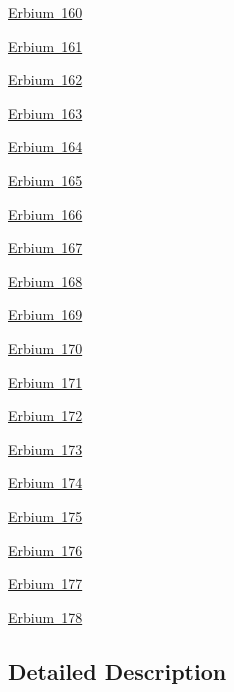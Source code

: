 \begin{DoxyCompactItemize}
\item 
\mbox{\hyperlink{group___isotope_const-_erbium-_er160}{Erbium 160}}
\item 
\mbox{\hyperlink{group___isotope_const-_erbium-_er161}{Erbium 161}}
\item 
\mbox{\hyperlink{group___isotope_const-_erbium-_er162}{Erbium 162}}
\item 
\mbox{\hyperlink{group___isotope_const-_erbium-_er163}{Erbium 163}}
\item 
\mbox{\hyperlink{group___isotope_const-_erbium-_er164}{Erbium 164}}
\item 
\mbox{\hyperlink{group___isotope_const-_erbium-_er165}{Erbium 165}}
\item 
\mbox{\hyperlink{group___isotope_const-_erbium-_er166}{Erbium 166}}
\item 
\mbox{\hyperlink{group___isotope_const-_erbium-_er167}{Erbium 167}}
\item 
\mbox{\hyperlink{group___isotope_const-_erbium-_er168}{Erbium 168}}
\item 
\mbox{\hyperlink{group___isotope_const-_erbium-_er169}{Erbium 169}}
\item 
\mbox{\hyperlink{group___isotope_const-_erbium-_er170}{Erbium 170}}
\item 
\mbox{\hyperlink{group___isotope_const-_erbium-_er171}{Erbium 171}}
\item 
\mbox{\hyperlink{group___isotope_const-_erbium-_er172}{Erbium 172}}
\item 
\mbox{\hyperlink{group___isotope_const-_erbium-_er173}{Erbium 173}}
\item 
\mbox{\hyperlink{group___isotope_const-_erbium-_er174}{Erbium 174}}
\item 
\mbox{\hyperlink{group___isotope_const-_erbium-_er175}{Erbium 175}}
\item 
\mbox{\hyperlink{group___isotope_const-_erbium-_er176}{Erbium 176}}
\item 
\mbox{\hyperlink{group___isotope_const-_erbium-_er177}{Erbium 177}}
\item 
\mbox{\hyperlink{group___isotope_const-_erbium-_er178}{Erbium 178}}
\end{DoxyCompactItemize}


\subsection{Detailed Description}
